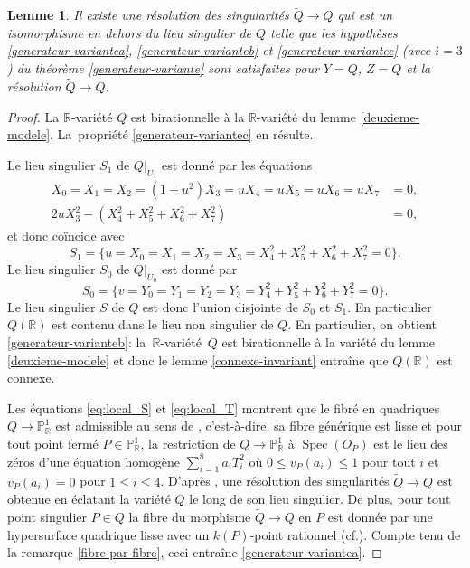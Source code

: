 \documentclass[11pt]{article}
\newcommand{\cf}{cf.\xspace}
\newtheorem{lemma}[thm]{Lemme}
\theoremstyle{definition}
\newcommand{\R}{\mathbb R}
\renewcommand{\P}{\mathbb P}
\newcommand{\Spec}{\operatorname{Spec}}
\begin{document}
\begin{lemma}\label{fibration-quadriques-a-c}
Il existe une résolution des singularités $\tilde{Q}\to Q$ qui est un isomorphisme en dehors du lieu singulier de $Q$ telle que les hypothèses \eqref{generateur-variantea}, \eqref{generateur-varianteb} et \eqref{generateur-variantec} (avec $i=3$) du théorème \ref{generateur-variante} sont satisfaites pour $Y=Q$, $Z=\tilde{Q}$ et la résolution $\tilde{Q}\to Q$.
\end{lemma}

\begin{proof}
La $\R$-variété $Q$ est birationnelle à la $\R$-variété du lemme \ref{deuxieme-modele}. La~propriété \eqref{generateur-variantec} en résulte.

Le lieu singulier $S_1$ de $Q|_{U_1}$ est donné par les équations
\begin{align*}
X_0=X_1=X_2=(1+u^2)X_3=uX_4=uX_5=uX_6=uX_7&=0, \\
2uX_3^2-(X_4^2+X_5^2+X_6^2+X_7^2)&=0,
\end{align*}
et donc coïncide avec
\[S_1=\{u=X_0=X_1=X_2=X_3=X_4^2+X_5^2+X_6^2+X_7^2=0\}.\]
Le lieu singulier $S_0$ de $Q|_{U_0}$ est donné par
\[S_0=\{v=Y_0=Y_1=Y_2=Y_3=Y_4^2+Y_5^2+Y_6^2+Y_7^2=0\}.\]
Le lieu singulier $S$ de $Q$ est donc l'union disjointe de $S_0$ et $S_1$. En particulier $Q(\R)$ est contenu dans le lieu non singulier de $Q$. En particulier, on obtient \eqref{generateur-varianteb}: la~$\R$\nobreakdash-variété~$Q$ est birationnelle à la variété du lemme \ref{deuxieme-modele} et donc le lemme \ref{connexe-invariant} entraîne que $Q(\R)$ est connexe.

Les équations \eqref{eq:local_S} et \eqref{eq:local_T} montrent que le fibré en quadriques $Q\to \P^1_\R$ est admissible au sens de \cite[Déf.\,3.1]{colliot1993groupe}, c'est-à-dire, sa fibre générique est lisse et pour tout point fermé $P\in \P^1_\R$, la restriction de $Q\to \P^1_\R$ à $\Spec(O_P)$ est le lieu des zéros d'une équation homogène $\sum_{i=1}^8 a_iT_i^2$ où $0\leq v_P(a_i)\leq 1$ pour tout $i$ et $v_P(a_i)=0$ pour $1\leq i\leq 4$. D'après \cite[Th.\,3.3(a)]{colliot1993groupe}, une résolution des singularités $\tilde{Q}\to Q$ est obtenue en éclatant la variété $Q$ le long de son lieu singulier. De plus, pour tout point singulier $P\in Q$ la fibre du morphisme $\tilde{Q}\to Q$ en $P$ est donnée par une hypersurface quadrique lisse avec un $k(P)$-point rationnel (\cf \cite[bas de p.\,488]{colliot1993groupe}). Compte tenu de la remarque \ref{fibre-par-fibre}, ceci entraîne \eqref{generateur-variantea}.
\end{proof}
\end{document}
